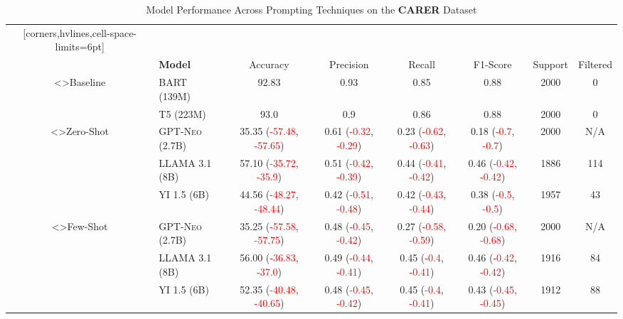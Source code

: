 \documentclass[twocolumn]{article}
\begin{document}
\onecolumn

\newpage

\begin{table}
\centering
\caption{Model Performance Across Prompting Techniques on the \textbf{CARER} Dataset}
\vspace{10pt}
\label{tab:model_performance_carer}
\begin{NiceTabular}{cl*{6}{c}}[corners,hvlines,cell-space-limits=6pt]
    &   
        &  \\
    & \textbf{Model}  
        & Accuracy & Precision & Recall & F1-Score & Support & Filtered \\

<\rotate>{Baseline}
	 & \textsc{BART (139M)} & 92.83 & 0.93 & 0.85 & 0.88 & 2000 & 0 \\
	 & \textsc{T5 (223M)} & 93.0 & 0.9 & 0.86 & 0.88 & 2000 & 0 \\

<\rotate>{Zero-Shot}
	 & \textsc{GPT-Neo (2.7B)} & 35.35 (\textcolor{Red}{-57.48}, \textcolor{Red}{-57.65}) & 0.61 (\textcolor{Red}{-0.32}, \textcolor{Red}{-0.29}) & 0.23 (\textcolor{Red}{-0.62}, \textcolor{Red}{-0.63}) & 0.18 (\textcolor{Red}{-0.7}, \textcolor{Red}{-0.7}) & 2000 & N/A \\
	 & \textsc{LLAMA 3.1 (8B)} & 57.10 (\textcolor{Red}{-35.72}, \textcolor{Red}{-35.9}) & 0.51 (\textcolor{Red}{-0.42}, \textcolor{Red}{-0.39}) & 0.44 (\textcolor{Red}{-0.41}, \textcolor{Red}{-0.42}) & 0.46 (\textcolor{Red}{-0.42}, \textcolor{Red}{-0.42}) & 1886 & 114 \\
	 & \textsc{YI 1.5 (6B)} & 44.56 (\textcolor{Red}{-48.27}, \textcolor{Red}{-48.44}) & 0.42 (\textcolor{Red}{-0.51}, \textcolor{Red}{-0.48}) & 0.42 (\textcolor{Red}{-0.43}, \textcolor{Red}{-0.44}) & 0.38 (\textcolor{Red}{-0.5}, \textcolor{Red}{-0.5}) & 1957 & 43 \\

<\rotate>{Few-Shot}
	 & \textsc{GPT-Neo (2.7B)} & 35.25 (\textcolor{Red}{-57.58}, \textcolor{Red}{-57.75}) & 0.48 (\textcolor{Red}{-0.45}, \textcolor{Red}{-0.42}) & 0.27 (\textcolor{Red}{-0.58}, \textcolor{Red}{-0.59}) & 0.20 (\textcolor{Red}{-0.68}, \textcolor{Red}{-0.68}) & 2000 & N/A \\
	 & \textsc{LLAMA 3.1 (8B)} & 56.00 (\textcolor{Red}{-36.83}, \textcolor{Red}{-37.0}) & 0.49 (\textcolor{Red}{-0.44}, \textcolor{Red}{-0.41}) & 0.45 (\textcolor{Red}{-0.4}, \textcolor{Red}{-0.41}) & 0.46 (\textcolor{Red}{-0.42}, \textcolor{Red}{-0.42}) & 1916 & 84 \\
	 & \textsc{YI 1.5 (6B)} & 52.35 (\textcolor{Red}{-40.48}, \textcolor{Red}{-40.65}) & 0.48 (\textcolor{Red}{-0.45}, \textcolor{Red}{-0.42}) & 0.45 (\textcolor{Red}{-0.4}, \textcolor{Red}{-0.41}) & 0.43 (\textcolor{Red}{-0.45}, \textcolor{Red}{-0.45}) & 1912 & 88 \\


\end{NiceTabular}
\end{table}
\end{document}
